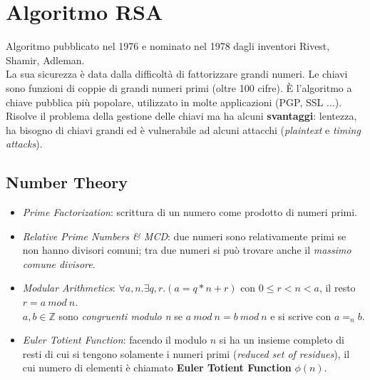 \documentclass[11pt, a4paper, twoside, italian]{report}
\theoremstyle{plain}
\begin{document}
\section*{Algoritmo RSA}
Algoritmo pubblicato nel 1976 e nominato nel 1978 dagli inventori Rivest, Shamir, Adleman.\\
La sua sicurezza è data dalla difficoltà di fattorizzare grandi numeri. Le chiavi sono funzioni di coppie di grandi numeri primi (oltre 100 cifre). È l'algoritmo a chiave pubblica più popolare, utilizzato in molte applicazioni (PGP, SSL $\dots$).\\
Risolve il problema della gestione delle chiavi ma ha alcuni \textbf{svantaggi}: lentezza, ha bisogno di chiavi grandi ed è vulnerabile ad alcuni attacchi (\textit{plaintext} e \textit{timing attacks}).
\subsection*{Number Theory}
\begin{itemize}
	\item \textit{Prime Factorization}: scrittura di un numero come prodotto di numeri primi.
	\item \textit{Relative Prime Numbers \& MCD}: due numeri sono relativamente primi se non hanno divisori comuni; tra due numeri si può trovare anche il \textit{massimo comune divisore}.
	\item \textit{Modular Arithmetics}: $\forall a, n. \exists q, r . (a = q * n + r)$ con $0 \leq r < n < a$, il resto $r = a~mod~n$.\\
	$a, b \in \mathbb{Z}$ sono \textit{congruenti modulo n} se $a~mod~n=b~mod~n$ e si scrive con $a=_n b$.
	\item \textit{Euler Totient Function}: facendo il modulo $n$ si ha un insieme completo di resti di cui si tengono solamente i numeri primi (\textit{reduced set of residues}), il cui numero di elementi è chiamato \textbf{Euler Totient Function} $\phi(n)$.
\end{itemize}
\end{document}
